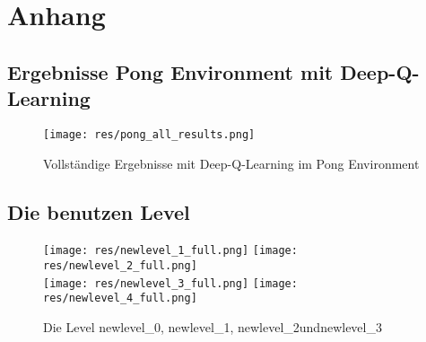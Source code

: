 \documentclass[11pt]{scrartcl}
\begin{document}
\newpage
%


\newpage
\listoffigures 
\listoftables 

\newpage
\section{Anhang}

\subsection{Ergebnisse Pong Environment mit Deep-Q-Learning}
\begin{figure}[htp]
\centering
\texttt{[image: res/pong\_all\_results.png]}
\caption{Vollständige Ergebnisse mit Deep-Q-Learning im Pong Environment}
\label{fig:pong_all_results}
\end{figure}

\subsection{Die benutzen Level}
\label{sec:levels}
\begin{figure}[htp]
\centering
\texttt{[image: res/newlevel\_1\_full.png]}
\texttt{[image: res/newlevel\_2\_full.png]}
\newline
\hspace{10pt}\\
\texttt{[image: res/newlevel\_3\_full.png]}
\texttt{[image: res/newlevel\_4\_full.png]}

\caption{
  Die Level \grqq newlevel\_0\grqq, \grqq newlevel\_1\grqq,
            \grqq newlevel\_2\grqq und\grqq newlevel\_3\grqq
        }
\end{figure}
\end{document}
